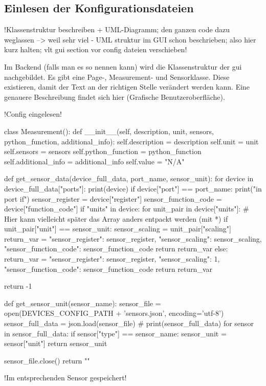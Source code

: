 \subsection{Einlesen der Konfigurationsdateien}
!Klassenstruktur beschreiben + UML-Diagramm; den ganzen code dazu weglassen --> weil sehr viel - UML struktur im GUI schon beschrieben; also hier kurz halten; vlt gui section vor config dateien verschieben!

Im Backend (falls man es so nennen kann) wird die Klassenstruktur der \acs{gui} nachgebildet. Es gibt eine Page-, Measurement- und Sensorklasse. Diese existieren, damit der Text an der richtigen Stelle verändert werden kann. Eine genauere Beschreibung findet sich hier (Grafische Benutzeroberfläche). 

!Config eingelesen!

\begin{pythoncode}
class Measurement():
	def __init__(self, description, unit, sensors, python_function, additional_info):
	self.description = description
	self.unit = unit
	self.sensors = sensors
	self.python_function = python_function
	self.additional_info = additional_info
	self.value = "N/A"
\end{pythoncode}

\begin{pythoncode}
	def get_sensor_data(device_full_data, port_name, sensor_unit):
	for device in device_full_data["ports"]:
	print(device)
	if device["port"] == port_name:
	print("in port if")
	sensor_register = device["register"]
	sensor_function_code = device["function_code"]
	if "units" in device:
	for unit_pair in device["units"]:  # Hier kann vielleicht später das Array anders entpackt werden (mit *)
	if unit_pair["unit"] == sensor_unit:
	sensor_scaling = unit_pair["scaling"]
	return_var = {"sensor_register": sensor_register, "sensor_scaling": sensor_scaling,
		"sensor_function_code": sensor_function_code}
	return return_var
	else:
	return_var = {"sensor_register": sensor_register, "sensor_scaling": 1,
		"sensor_function_code": sensor_function_code}
	return return_var
	
	
	return -1
	
	
	def get_sensor_unit(sensor_name):
	sensor_file = open(DEVICES_CONFIG_PATH + 'sensors.json', encoding='utf-8')
	sensor_full_data = json.load(sensor_file)
	# print(sensor_full_data)
	for sensor in sensor_full_data:
	if sensor["type"] == sensor_name:
	sensor_unit = sensor["unit"]
	return sensor_unit
	
	sensor_file.close()
	return ""
\end{pythoncode}

!Im entsprechenden Sensor gespeichert!
